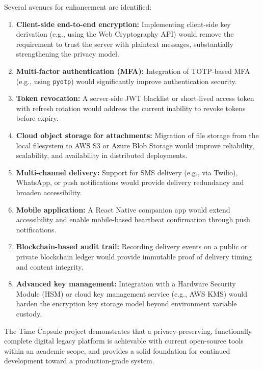\documentclass[12pt, a4paper]{article}
\begin{document}
Several avenues for enhancement are identified:

\begin{enumerate}
  \item \textbf{Client-side end-to-end encryption:} Implementing client-side key derivation (e.g., using the Web Cryptography API) would remove the requirement to trust the server with plaintext messages, substantially strengthening the privacy model.
  \item \textbf{Multi-factor authentication (MFA):} Integration of TOTP-based MFA (e.g., using \texttt{pyotp}) would significantly improve authentication security.
  \item \textbf{Token revocation:} A server-side JWT blacklist or short-lived access token with refresh rotation would address the current inability to revoke tokens before expiry.
  \item \textbf{Cloud object storage for attachments:} Migration of file storage from the local filesystem to AWS S3 or Azure Blob Storage would improve reliability, scalability, and availability in distributed deployments.
  \item \textbf{Multi-channel delivery:} Support for SMS delivery (e.g., via Twilio), WhatsApp, or push notifications would provide delivery redundancy and broaden accessibility.
  \item \textbf{Mobile application:} A React Native companion app would extend accessibility and enable mobile-based heartbeat confirmation through push notifications.
  \item \textbf{Blockchain-based audit trail:} Recording delivery events on a public or private blockchain ledger would provide immutable proof of delivery timing and content integrity.
  \item \textbf{Advanced key management:} Integration with a Hardware Security Module (HSM) or cloud key management service (e.g., AWS KMS) would harden the encryption key storage model beyond environment variable custody.
\end{enumerate}

The Time Capsule project demonstrates that a privacy-preserving, functionally complete digital legacy platform is achievable with current open-source tools within an academic scope, and provides a solid foundation for continued development toward a production-grade system.
\end{document}
